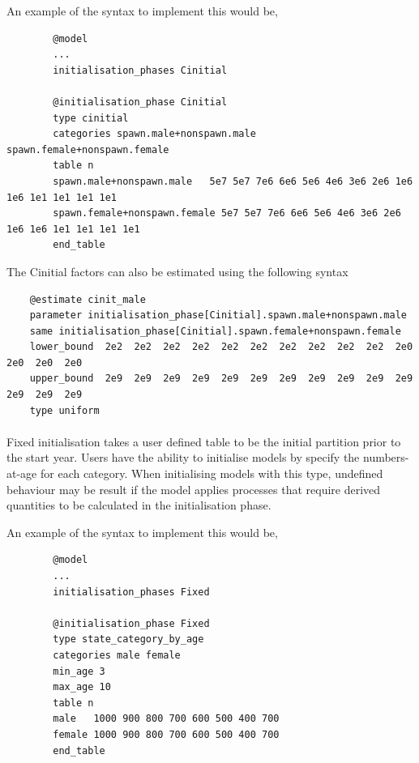 An example of the syntax to implement this would be,

{\small{\begin{verbatim}
		@model
		...
		initialisation_phases Cinitial
		
		@initialisation_phase Cinitial
		type cinitial
		categories spawn.male+nonspawn.male 	spawn.female+nonspawn.female
		table n
		spawn.male+nonspawn.male   5e7 5e7 7e6 6e6 5e6 4e6 3e6 2e6 1e6 1e6 1e1 1e1 1e1 1e1	
		spawn.female+nonspawn.female 5e7 5e7 7e6 6e6 5e6 4e6 3e6 2e6 1e6 1e6 1e1 1e1 1e1 1e1
		end_table
		\end{verbatim}}}
	
The Cinitial factors can also be estimated using the following syntax
		
{\small{\begin{verbatim}	
	@estimate cinit_male
	parameter initialisation_phase[Cinitial].spawn.male+nonspawn.male
	same initialisation_phase[Cinitial].spawn.female+nonspawn.female
	lower_bound  2e2  2e2  2e2  2e2  2e2  2e2  2e2  2e2  2e2  2e2  2e0  2e0  2e0  2e0
	upper_bound  2e9  2e9  2e9  2e9  2e9  2e9  2e9  2e9  2e9  2e9  2e9  2e9  2e9  2e9
	type uniform
	\end{verbatim}}}

\paragraph{}

Fixed initialisation takes a user defined table to be the initial partition prior to the start year. Users have the ability to initialise models by specify the numbers-at-age for each category. When initialising models with this type, undefined behaviour may be result if the model applies processes that require derived quantities to be calculated in the initialisation phase.

An example of the syntax to implement this would be,
{\small{\begin{verbatim}
		@model
		...
		initialisation_phases Fixed
		
		@initialisation_phase Fixed
		type state_category_by_age
		categories male female
		min_age 3
		max_age 10
		table n
		male   1000 900 800 700 600 500 400 700
		female 1000 900 800 700 600 500 400 700
		end_table
		\end{verbatim}}}

\subsubsection{}

